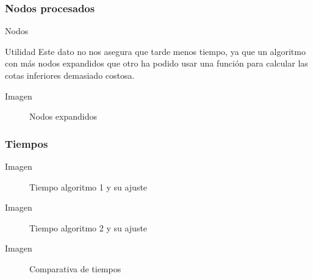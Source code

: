 \subsubsection{Nodos procesados}
\begin{frame}{Nodos}
	\begin{block}{Utilidad}
	Este dato no nos asegura que tarde menos tiempo, ya que un algoritmo con más nodos 
	expandidos que otro ha podido usar una función para calcular las cotas inferiores demasiado costosa.
	\end{block}
\end{frame}

\begin{frame}
	\begin{exampleblock}{Imagen}
	\begin{figure}[H]
    		\centering
    		\caption{Nodos expandidos}
	\end{figure}
	\end{exampleblock}
\end{frame}


\subsubsection{Tiempos}
\begin{frame}
	\begin{exampleblock}{Imagen}
	\begin{figure}[H]
    		\centering
    		\caption{Tiempo algoritmo 1 y su ajuste}
	\end{figure}
	\end{exampleblock}
\end{frame}

\begin{frame}
	\begin{exampleblock}{Imagen}
	\begin{figure}[H]
    		\centering
    		\caption{Tiempo algoritmo 2 y su ajuste}
	\end{figure}
	\end{exampleblock}
\end{frame}


\begin{frame}
	\begin{exampleblock}{Imagen}
	\begin{figure}[H]
    		\centering
    		\caption{Comparativa de tiempos}
	\end{figure}
	\end{exampleblock}
\end{frame}



